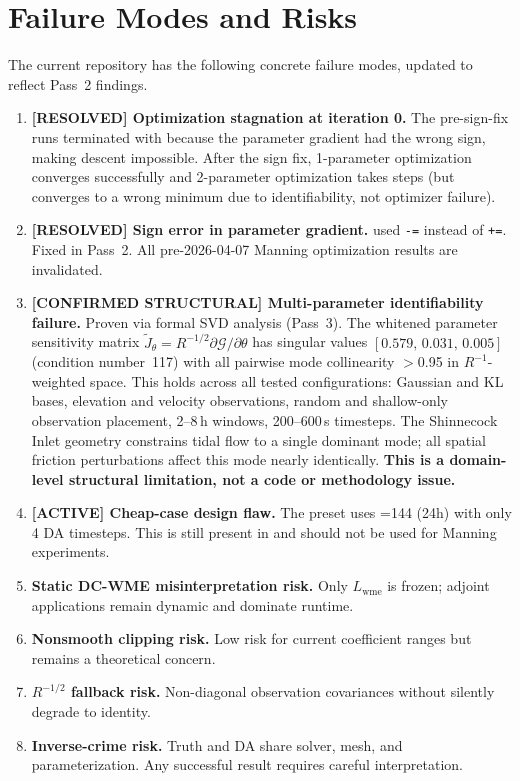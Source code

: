 \documentclass[11pt]{article}
\begin{document}
\section{Failure Modes and Risks}
The current repository has the following concrete failure modes, updated to reflect Pass~2 findings.
\begin{enumerate}
\item \textbf{[RESOLVED] Optimization stagnation at iteration 0.} The pre-sign-fix runs terminated with  because the parameter gradient had the wrong sign, making descent impossible. After the sign fix, 1-parameter optimization converges successfully and 2-parameter optimization takes steps (but converges to a wrong minimum due to identifiability, not optimizer failure).
\item \textbf{[RESOLVED] Sign error in parameter gradient.}  used \texttt{-=} instead of \texttt{+=}. Fixed in Pass~2. All pre-2026-04-07 Manning optimization results are invalidated.
\item \textbf{[CONFIRMED STRUCTURAL] Multi-parameter identifiability failure.} Proven via formal SVD analysis (Pass~3). The whitened parameter sensitivity matrix $\widetilde{J}_\theta = R^{-1/2}\partial\mathcal{G}/\partial\theta$ has singular values $[0.579,\, 0.031,\, 0.005]$ (condition number~117) with all pairwise mode collinearity $>$0.95 in $R^{-1}$-weighted space. This holds across all tested configurations: Gaussian and KL bases, elevation and velocity observations, random and shallow-only observation placement, 2--8\,h windows, 200--600\,s timesteps. The Shinnecock Inlet geometry constrains tidal flow to a single dominant mode; all spatial friction perturbations affect this mode nearly identically. \textbf{This is a domain-level structural limitation, not a code or methodology issue.}
\item \textbf{[ACTIVE] Cheap-case design flaw.} The  preset uses =144 (24h) with only 4 DA timesteps. This is still present in  and should not be used for Manning experiments.
\item \textbf{Static DC-WME misinterpretation risk.} Only $L_{\mathrm{wme}}$ is frozen; adjoint applications remain dynamic and dominate runtime.
\item \textbf{Nonsmooth clipping risk.} Low risk for current coefficient ranges but remains a theoretical concern.
\item \textbf{$R^{-1/2}$ fallback risk.} Non-diagonal observation covariances without  silently degrade to identity.
\item \textbf{Inverse-crime risk.} Truth and DA share solver, mesh, and parameterization. Any successful result requires careful interpretation.
\end{enumerate}
\end{document}
